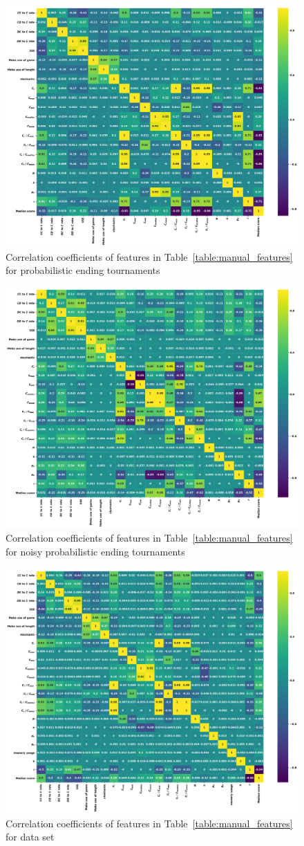 \documentclass{article}
\begin{document}
\begin{figure}[!htbp]
    \begin{center}
        \includegraphics[width=.75\linewidth]{../images/probend_correlation_plot.pdf}
    \end{center}
    \caption{Correlation coefficients of features in Table~\ref{table:manual_features}
    for probabilistic ending tournaments}
\end{figure}
\begin{figure}[!htbp]
    \begin{center}
        \includegraphics[width=.75\linewidth]{../images/probend_noise_correlation_plot.pdf}
    \end{center}
    \caption{Correlation coefficients of features in Table~\ref{table:manual_features}
    for noisy probabilistic ending tournaments}
\end{figure}
\begin{figure}[!htbp]
    \begin{center}
        \includegraphics[width=.75\linewidth]{../images/merged_correlation_plot.pdf}
    \end{center}
    \caption{Correlation coefficients of features in Table~\ref{table:manual_features}
    for data set}
\end{figure}
\end{document}

